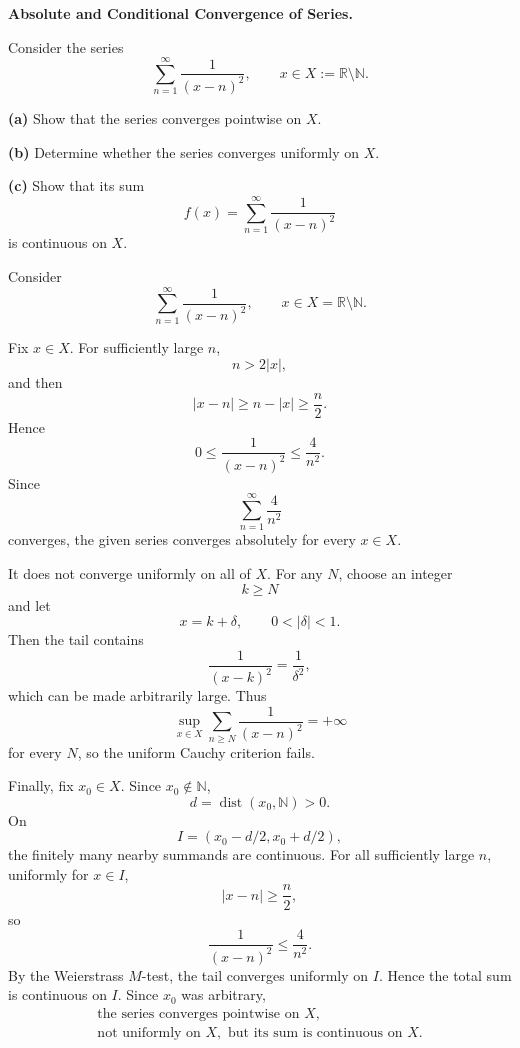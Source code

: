 \begin{problem}[CP-II-0155]
\label{prob:cp-ii-0155}
\textbf{Absolute and Conditional Convergence of Series.}

\hspace*{1.5em}Consider the series
\[
\sum_{n=1}^{\infty}\frac1{(x-n)^2},
\qquad
x\in X:=\mathbb R\setminus\mathbb N.
\]

\par\noindent\textbf{(a)}\quad
Show that the series converges pointwise on \(X\).

\par\noindent\textbf{(b)}\quad
Determine whether the series converges uniformly on \(X\).

\par\noindent\textbf{(c)}\quad
Show that its sum
\[
f(x)=\sum_{n=1}^{\infty}\frac1{(x-n)^2}
\]
is continuous on \(X\).
\end{problem}

\begin{solution}
Consider
\[
\sum_{n=1}^{\infty}\frac1{(x-n)^2},
\qquad
x\in X=\mathbb R\setminus\mathbb N.
\]

Fix \(x\in X\). For sufficiently large \(n\),
\[
n>2|x|,
\]
and then
\[
|x-n|
\ge
n-|x|
\ge
\frac n2.
\]
Hence
\[
0\le\frac1{(x-n)^2}\le\frac4{n^2}.
\]
Since
\[
\sum_{n=1}^{\infty}\frac4{n^2}
\]
converges, the given series converges absolutely for every \(x\in X\).

It does not converge uniformly on all of \(X\). For any \(N\), choose an integer
\[
k\ge N
\]
and let
\[
x=k+\delta,
\qquad
0<|\delta|<1.
\]
Then the tail contains
\[
\frac1{(x-k)^2}
=
\frac1{\delta^2},
\]
which can be made arbitrarily large. Thus
\[
\sup_{x\in X}
\sum_{n\ge N}\frac1{(x-n)^2}
=
+\infty
\]
for every \(N\), so the uniform Cauchy criterion fails.

Finally, fix \(x_0\in X\). Since \(x_0\notin\mathbb N\),
\[
d=\operatorname{dist}(x_0,\mathbb N)>0.
\]
On
\[
I=(x_0-d/2,x_0+d/2),
\]
the finitely many nearby summands are continuous. For all sufficiently large \(n\),
uniformly for \(x\in I\),
\[
|x-n|\ge\frac n2,
\]
so
\[
\frac1{(x-n)^2}\le\frac4{n^2}.
\]
By the Weierstrass \(M\)-test, the tail converges uniformly on \(I\). Hence the total sum is
continuous on \(I\). Since \(x_0\) was arbitrary,
\[
\boxed{\begin{gathered}
\text{the series converges pointwise on }X,\\
\text{not uniformly on }X,\text{ but its sum is continuous on }X.
\end{gathered}}
\]
\end{solution}


